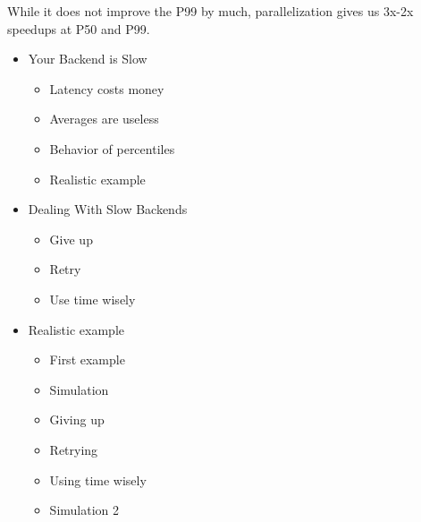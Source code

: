 While it does not improve the P99 by much,
parallelization gives us 3x-2x speedups
at P50 and P99.




\begin{itemize}
\item Your Backend is Slow
\begin{itemize}
\item Latency costs money
\item Averages are useless
\item Behavior of percentiles
\item Realistic example
\end{itemize}
\item Dealing With Slow Backends
\begin{itemize}
\item Give up
\item Retry
\item Use time wisely
\end{itemize}
\item Realistic example
\begin{itemize}
\item First example
\item Simulation
\item Giving up
\item Retrying
\item Using time wisely
\item Simulation 2
\end{itemize}
\end{itemize}



